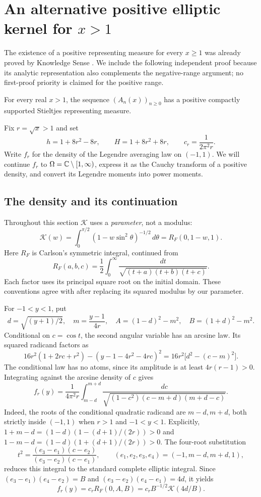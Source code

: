 \section{An alternative positive elliptic kernel for \texorpdfstring{$x>1$}{x>1}}\label{sec:positive}
The existence of a positive representing measure for every $x\ge1$ was
already proved by Knowledge Sense \cite{KnowledgeSense}. We include
the following independent proof because its analytic representation
also complements the negative-range argument; no first-proof
priority is claimed for the positive range.

\begin{theorem}\label{thm:positive}
For every real $x>1$, the sequence $(A_n(x))_{n\ge0}$ has a positive
compactly supported Stieltjes representing measure.
\end{theorem}
Fix $r=\sqrt{x}>1$ and set
\[
 h=1+8r^2-8r,\qquad H=1+8r^2+8r,\qquad c_r=\frac1{2\pi^2r}.
\]
Write $f_r$ for the density of the Legendre averaging law on $(-1,1)$.
We will continue $f_r$ to $\Omega=\mathbb C\setminus[1,\infty)$, express it as
the Cauchy transform of a positive density, and convert its Legendre
moments into power moments.

\subsection{The density and its continuation}
Throughout this section $\mathcal K$ uses a \emph{parameter}, not a modulus:
\[
 \mathcal K(w)=\int_0^{\pi/2}(1-w\sin^2\theta)^{-1/2}\,d\theta
             =R_F(0,1-w,1).
\]
Here $R_F$ is Carlson's symmetric integral, continued from
\[
 R_F(a,b,c)=\frac12\int_0^\infty
              \frac{dt}{\sqrt{(t+a)(t+b)(t+c)}}.
\]
Each factor uses its principal square root on the initial domain.
These conventions agree with \cite[Sections 19.16 and 19.25]{DLMF}
after replacing its squared modulus by our parameter.

For $-1<y<1$, put
\begin{equation}\label{eq:AB}
 d=\sqrt{(y+1)/2},\quad m=\frac{y-1}{4r},\quad
 A=(1-d)^2-m^2,\quad B=(1+d)^2-m^2 .
\end{equation}
Conditional on $c=\cos t$, the second angular variable has an arcsine
law. Its squared radicand factors as
\[
 16r^2(1+2rc+r^2)-(y-1-4r^2-4rc)^2
 =16r^2\bigl[d^2-(c-m)^2\bigr].
\]
The conditional law has no atoms, since its amplitude is at least
$4r(r-1)>0$. Integrating against the arcsine density of $c$ gives
\[
 f_r(y)=\frac1{4\pi^2r}\int_{m-d}^{m+d}
 \frac{dc}{\sqrt{(1-c^2)(c-m+d)(m+d-c)}} .
\]
Indeed, the roots of the conditional quadratic radicand are $m-d,m+d$,
both strictly inside $(-1,1)$ when $r>1$ and $-1<y<1$.
Explicitly,
$1+m-d=(1-d)(1-(d+1)/(2r))>0$ and
$1-m-d=(1-d)(1+(d+1)/(2r))>0$.
The four-root substitution
\[
 t^2=\frac{(e_3-e_1)(c-e_2)}{(e_3-e_2)(c-e_1)},
 \qquad (e_1,e_2,e_3,e_4)=(-1,m-d,m+d,1),
\]
reduces this integral to the standard complete elliptic integral. Since
$(e_3-e_1)(e_4-e_2)=B$ and
$(e_3-e_2)(e_4-e_1)=4d$, it yields
\begin{equation}\label{eq:ellipticf}
 f_r(y)=c_r R_F(0,A,B)
       =c_r B^{-1/2}\mathcal K(4d/B).
\end{equation}

